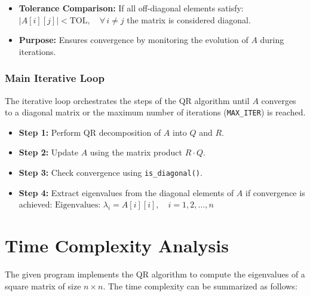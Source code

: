 \documentclass[12pt]{article}
\begin{document}


\begin{itemize}
    \item \textbf{Tolerance Comparison:} If all off-diagonal elements satisfy:  
    $|A[i][j]| < \text{TOL}, \quad \forall \, i \neq j$  
    the matrix is considered diagonal.
    \item \textbf{Purpose:} Ensures convergence by monitoring the evolution of $A$ during iterations.
\end{itemize}

\subsubsection{Main Iterative Loop}
The iterative loop orchestrates the steps of the QR algorithm until $A$ converges to a diagonal matrix or the maximum number of iterations (\texttt{MAX\_ITER}) is reached.



\begin{itemize}
    \item \textbf{Step 1:} Perform QR decomposition of $A$ into $Q$ and $R$.
    \item \textbf{Step 2:} Update $A$ using the matrix product $R \cdot Q$.
    \item \textbf{Step 3:} Check convergence using \texttt{is\_diagonal()}.
    \item \textbf{Step 4:} Extract eigenvalues from the diagonal elements of $A$ if convergence is achieved:  
    $\text{Eigenvalues: } \lambda_i = A[i][i], \quad i = 1, 2, \ldots, n$
\end{itemize}

\section*{Time Complexity Analysis}

The given program implements the QR algorithm to compute the eigenvalues of a square matrix of size $n \times n$. The time complexity can be summarized as follows:
\end{document}
